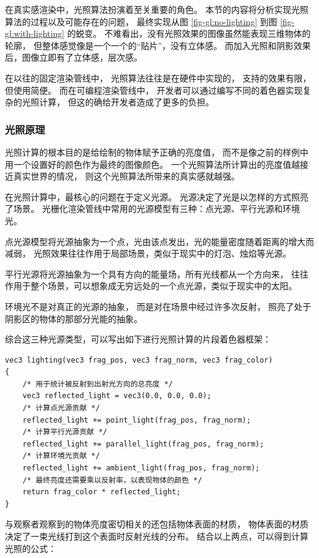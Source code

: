 \documentclass[fontset=windows]{ctexart}
\begin{document}
在真实感渲染中，光照算法扮演着至关重要的角色。
本节的内容将分析实现光照算法的过程以及可能存在的问题，
最终实现从图 \ref{fig-gl:no-lighting} 到图 \ref{fig-gl:with-lighting} 的蜕变。
不难看出，没有光照效果的图像虽然能表现三维物体的轮廓，
但整体感觉像是一个一个的“贴片”，没有立体感。
而加入光照和阴影效果后，图像立即有了立体感，层次感。

在以往的固定渲染管线中，
光照算法往往是在硬件中实现的，
支持的效果有限，但使用简便。
而在可编程渲染管线中，
开发者可以通过编写不同的着色器实现复杂的光照计算，
但这的确给开发者造成了更多的负担。

\subsubsection{光照原理}

光照计算的根本目的是给绘制的物体赋予正确的亮度值，
而不是像之前的样例中用一个设置好的颜色作为最终的图像颜色。
一个光照算法所计算出的亮度值越接近真实世界的情况，
则这个光照算法所带来的真实感就越强。

在光照计算中，最核心的问题在于定义光源。
光源决定了光是以怎样的方式照亮了场景。
光栅化渲染管线中常用的光源模型有三种：点光源、平行光源和环境光。

点光源模型将光源抽象为一个点，光由该点发出，光的能量密度随着距离的增大而减弱，
光照效果往往作用于局部场景，类似于现实中的灯泡、烛焰等光源。

平行光源将光源抽象为一个具有方向的能量场，所有光线都从一个方向来，
往往作用于整个场景，可以想象成无穷远处的一个点光源，类似于现实中的太阳。

环境光不是对真正的光源的抽象，
而是对在场景中经过许多次反射，
照亮了处于阴影区的物体的那部分光能的抽象。

综合这三种光源类型，可以写出如下进行光照计算的片段着色器框架：

\begin{lstlisting}
vec3 lighting(vec3 frag_pos, vec3 frag_norm, vec3 frag_color)
{
    /* 用于统计被反射到出射光方向的总亮度 */
    vec3 reflected_light = vec3(0.0, 0.0, 0.0);
    /* 计算点光源贡献 */
    reflected_light += point_light(frag_pos, frag_norm);
    /* 计算平行光源贡献 */
    reflected_light += parallel_light(frag_pos, frag_norm);
    /* 计算环境光贡献 */
    reflected_light += ambient_light(frag_pos, frag_norm);
    /* 最终亮度还需要乘以反射率，以表现物体的颜色 */
    return frag_color * reflected_light;
}
\end{lstlisting}

与观察者观察到的物体亮度密切相关的还包括物体表面的材质，
物体表面的材质决定了一束光线打到这个表面时反射光线的分布。
结合以上两点，可以得到计算光照的公式：
\end{document}
